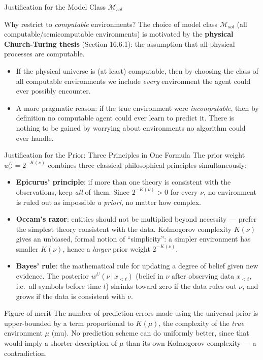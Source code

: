 \documentclass[aspectratio=169,10pt]{beamer}
\newcommand{\Mc}{\mathcal{M}}
\begin{document}
\begin{frame}{Justification for the Model Class $\Mc_{sol}$}
  \begin{block}{Why restrict to \emph{computable} environments?}
    The choice of model class $\Mc_{sol}$ (all computable/semicomputable
    environments) is motivated by the \textbf{physical Church-Turing thesis}
    (Section 16.6.1): the assumption that all physical processes are
    computable.
  \end{block}
  \begin{itemize}
    \item If the physical universe is (at least) computable, then by
      choosing the class of all computable environments we include
      \emph{every} environment the agent could ever possibly encounter.
    \item A more pragmatic reason: if the true environment were
      \emph{incomputable}, then by definition no computable agent could ever
      learn to predict it. There is nothing to be gained by worrying about
      environments no algorithm could ever handle.
  \end{itemize}
\end{frame}

\begin{frame}{Justification for the Prior: Three Principles in One Formula}
  The prior weight $w^U_\nu = 2^{-K(\nu)}$ combines three classical
  philosophical principles simultaneously:

  \begin{itemize}
    \item \textbf{Epicurus' principle}: if more than one theory is
      consistent with the observations, keep \emph{all} of them. Since
      $2^{-K(\nu)} > 0$ for every $\nu$, no environment is ruled out as
      impossible \emph{a priori}, no matter how complex.
    \item \textbf{Occam's razor}: entities should not be multiplied beyond
      necessity --- prefer the simplest theory consistent with the data.
      Kolmogorov complexity $K(\nu)$ gives an unbiased, formal notion of
      ``simplicity'': a simpler environment has smaller $K(\nu)$, hence a
      \emph{larger} prior weight $2^{-K(\nu)}$.
    \item \textbf{Bayes' rule}: the mathematical rule for updating a degree
      of belief given new evidence. The posterior $w^U(\nu\,|\,x_{<t})$
      (belief in $\nu$ after observing data $x_{<t}$, i.e.\ all symbols
      before time $t$) shrinks toward zero if the data rules out $\nu$, and
      grows if the data is consistent with $\nu$.
  \end{itemize}

  \vspace{0.3em}
  \begin{block}{Figure of merit}
    The number of prediction errors made using the universal prior is
    upper-bounded by a term proportional to $K(\mu)$, the complexity of the
    \emph{true} environment $\mu$ (mu). No prediction scheme can do
    uniformly better, since that would imply a shorter description of
    $\mu$ than its own Kolmogorov complexity --- a contradiction.
  \end{block}
\end{frame}
\end{document}

